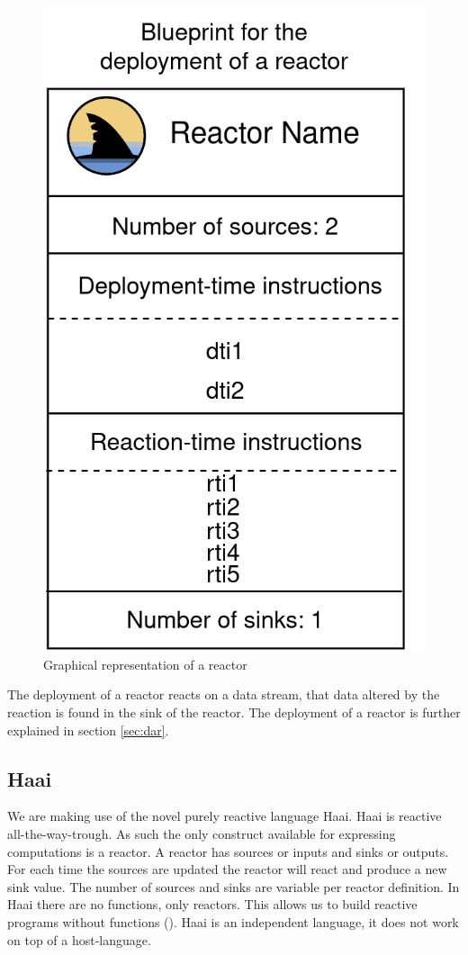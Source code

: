 \documentclass[a4paper]{book}
\begin{document}
\begin{figure}[h]
	\includegraphics[scale=0.2]{reactor300.drawio}
	\centering
	\caption{Graphical representation of a reactor}
	\label{fig:reactor}
\end{figure}

The deployment of a reactor reacts on a data stream, that data altered by the reaction is found in the sink of the reactor. The deployment of a reactor is further explained in section \ref{sec:dar}.

\subsection{Haai}
We are making use of the novel purely reactive language Haai. Haai is reactive all-the-way-trough. As such the only construct available for expressing computations is a reactor. A reactor has sources or inputs and sinks or outputs. For each time the sources are updated the reactor will react and produce a new sink value. The number of sources and sinks are variable per reactor definition. In Haai there are no functions, only reactors. This allows us to build reactive programs without functions (\cite{oeyen_reactive_2024}). Haai is an independent language, it does not work on top of a host-language.  
\end{document}
